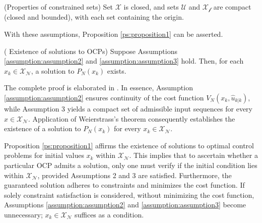 \begin{assumption} \label{assumption:assumption3}
(Properties of constrained sets) Set $\mathcal{X}$ is closed, and sets $\mathcal{U}$ and $\mathcal{X_f}$ are compact (closed and bounded), with each set containing the origin.
\end{assumption}
With these assumptions, Proposition \ref{ps:proposition1} can be asserted.

\begin{proposition} \label{ps:proposition1}
    ( Existence of solutions to OCPs) Suppose Assumptions \ref{assumption:assumption2} and \ref{assumption:assumption3} hold. Then, for each $x_k \in \mathcal{X_N}$, a solution to $P_N(x_k)$ exists.
\end{proposition}


The complete proof is elaborated in \cite{rawlings2009model}. In essence, Assumption \ref{assumption:assumption2} ensures continuity of the cost function $V_N(x_k, \hat{u}_{k|k})$, while Assumption 3 yields a compact set of admissible input sequences for every $x \in \mathcal{X_N}$. Application of Weierstrass's theorem consequently establishes the existence of a solution to $P_N(x_k)$ for every $x_k \in \mathcal{X_N}$.

Proposition \ref{ps:proposition1} affirms the existence of solutions to optimal control problems for initial values $x_k$ within $\mathcal{X_N}$. This implies that to ascertain whether a particular OCP admits a solution, only one must verify if the initial condition lies within $\mathcal{X_N}$, provided Assumptions 2 and 3 are satisfied. Furthermore, the guaranteed solution adheres to constraints and minimizes the cost function. If solely constraint satisfaction is considered, without minimizing the cost function, Assumptions \ref{assumption:assumption2} and \ref{assumption:assumption3} become unnecessary; $x_k \in \mathcal{X_N}$ suffices as a condition.



